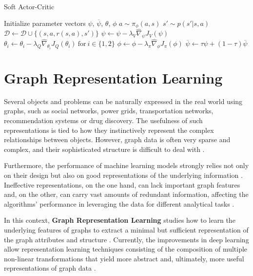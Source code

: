 \begin{algorithm}
	\caption{Soft Actor-Critic}
	\label{alg:sac}
	\begin{algorithmic}
		\State Initialize parameter vectors $\psi$, $\overline{\psi}$, $\theta$, $\phi$
				\State $a \sim \pi_\phi (a, s)$
				\State $s' \sim p(s'|s, a)$
				\State $\mathcal{D} \leftarrow \mathcal{D} \cup \{(s, a, r(s, a), s')\}$
			\EndFor
				\State $\psi \leftarrow \psi - \lambda_V \hat{\nabla}_\psi J_V (\psi) $
				\State $\theta_i \leftarrow \theta_i - \lambda_Q \hat{\nabla}_{\theta_i} J_Q (\theta_i)\ \text{for}\ i \in \{1,2\}$
				\State $\phi \leftarrow \phi - \lambda_\pi \hat{\nabla}_\phi J_\pi (\phi)$
				\State $\overline{\psi} \leftarrow \tau \psi + (1 - \tau) \overline{\psi}$
			\EndFor
		\EndFor
	\end{algorithmic}
\end{algorithm}

\section{Graph Representation Learning} \label{sec:back-grl}

Several objects and problems can be naturally expressed in the real world using graphs, such as social networks, power grids, transportation networks, recommendation systems or drug discovery. The usefulness of such representations is tied to how they instinctively represent the complex relationships between objects. However, graph data is often very sparse and complex, and their sophisticated structure is difficult to deal with \cite{liuIntroductionGraphNeural2020, zhaoRepresentationLearning2022}. \par

Furthermore, the performance of machine learning models strongly relies not only on their design but also on good representations of the underlying information \cite{liuIntroductionGraphNeural2020}.  Ineffective representations, on the one hand, can lack important graph features and, on the other, can carry vast amounts of redundant information, affecting the algorithms' performance in leveraging the data for different analytical tasks \cite{liuIntroductionGraphNeural2020, wuGraphNeuralNetworks2022}. \par

In this context, \textbf{Graph Representation Learning} studies how to learn the underlying features of graphs to extract a minimal but sufficient representation of the graph attributes and structure \cite{hamiltonGraphRepresentationLearning, zhaoRepresentationLearning2022, cuiGraphRepresentationLearning2022}. Currently, the improvements in deep learning allow representation learning techniques consisting of the composition of multiple non-linear transformations that yield more abstract and, ultimately, more useful representations of graph data \cite{cuiGraphRepresentationLearning2022}. 

